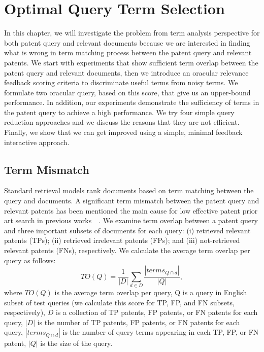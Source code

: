 \chapter{Optimal Query Term Selection}
\label{cha:analysis}
In this chapter, we will investigate the problem from term analysis perspective for both patent query and relevant documents because we are interested 
in finding what is wrong in term matching process between the patent query and relevant patents. 
We start with experiments that show sufficient term overlap between the patent query and relevant documents, 
then we introduce an oracular relevance feedback scoring criteria to discriminate useful terms from noisy terms. 
We formulate two oracular query, based on this score, that give us an upper-bound performance. In addition, our experiments demonstrate the sufficiency of terms in the patent query to achieve a high performance. 
We try four simple query reduction approaches and we discuss the reasons that they are not efficient.  
Finally, we show that we can get improved using a simple, minimal feedback interactive approach.

\section{Term Mismatch}
\label{sec:termmismatch}
%
Standard retrieval models rank documents based on term matching between the query and documents.  
A significant term mismatch between the patent query and relevant patents has been mentioned the
main cause for low effective patent prior art search in previous works~\citep{roda2010clef}~\citep{magdy2012toward}. 
We examine term overlap between a patent query and three important subsets of documents for each query: (i) retrieved relevant patents (TPs); (ii) retrieved irrelevant patents (FPs); and (iii) not-retrieved relevant patents (FNs), respectively. We calculate the average term overlap per query as follows:
\begin{equation} 
TO (Q) = \frac{1}{|D|}\sum_{d\in D}\frac{|terms_{Q\cap d}|}{|Q|},
\label{eq:fntermoverlap}
\end{equation}
where $TO(Q)$ is the average term overlap per query, Q is a query in English subset of test queries (we calculate this score for TP, FP, and FN subsets, respectively), $D$ is a collection of TP patents, FP patents, or FN patents for each query, $|D|$ is the number of TP patents, FP patents, or FN patents for each query, $ |terms_{Q\cap d}| $ is the number of query terms appearing in each TP, FP, or FN patent, $ |Q| $ is the size of the query.

